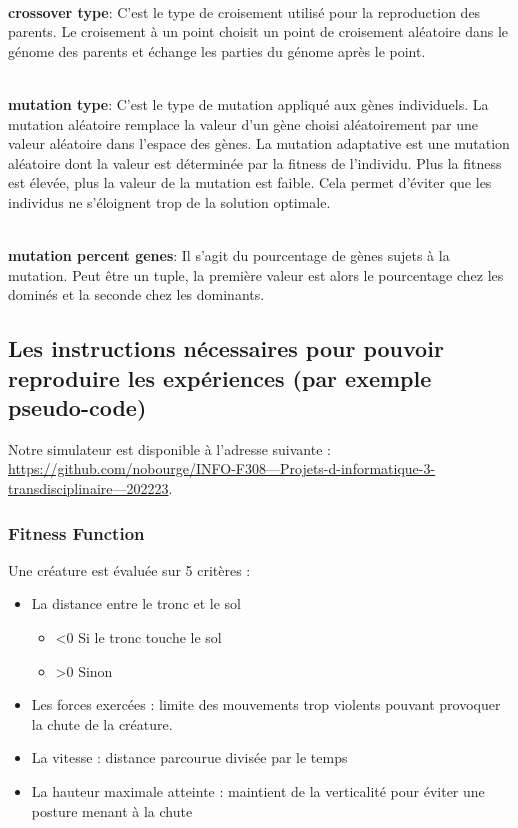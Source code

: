 \documentclass[journal, a4paper]{IEEEtran}
\begin{document}
    \\ \textbf{crossover type}: C'est le type de croisement utilisé
	pour la reproduction des parents. Le croisement à un point
	choisit un point de croisement aléatoire dans le génome des
	parents et échange les parties du génome
	après le point.

    \\ \textbf{mutation type}: C'est le type de mutation appliqué aux
	gènes individuels. La mutation aléatoire remplace la valeur d'un
	gène choisi aléatoirement par une valeur aléatoire dans l'espace
	des
	gènes.
	La mutation adaptative est une mutation aléatoire dont la valeur
	est déterminée par la fitness de l'individu. Plus la fitness est
	élevée, plus la valeur de la mutation est faible. Cela permet
	d'éviter que les individus ne s'éloignent trop de la solution
	optimale.

    \\ \textbf{mutation percent genes}: Il s'agit du pourcentage de
	gènes sujets à la mutation. Peut être un tuple, la première valeur
	est alors le pourcentage chez les dominés et la seconde chez les
	dominants.


	\subsection{Les instructions nécessaires pour pouvoir reproduire les expériences (par exemple pseudo-code)}\label{subsec:les-instructions-necessaires-pour-pouvoir-reproduire-les-experiences-(par-exemple-pseudo-code)}
	Notre  simulateur  est  disponible  à  l’adresse  suivante  :
	\href{https://github.com/nobourge/INFO-F308---Projets-d-informatique-3-transdisciplinaire---202223}{https://github.com/nobourge/INFO-F308---Projets-d-informatique-3-transdisciplinaire---202223}.

	\subsubsection{Fitness Function}
		Une créature est évaluée sur 5 critères :
		\begin{itemize}
			\item La distance entre le tronc et le sol 
			\begin{itemize}
				\item <0 Si le tronc touche le sol
				\item >0 Sinon
			\end{itemize}
			\item Les forces exercées : limite des mouvements
			trop violents pouvant provoquer la chute de la créature.
			\item La vitesse : distance parcourue divisée par le temps
			\item La hauteur maximale atteinte : maintient de la verticalité
			pour éviter une posture menant à la chute
		\end{itemize}
\end{document}
